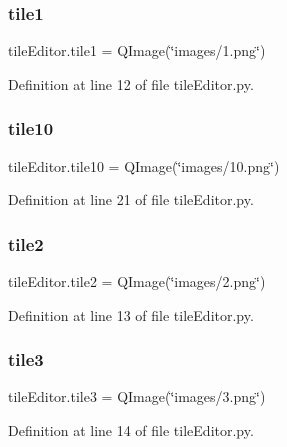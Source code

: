 \subsubsection{\texorpdfstring{tile1}{tile1}}
{\footnotesize\ttfamily tile\+Editor.\+tile1 = Q\+Image(\char`\"{}images/1.png\char`\"{})}



Definition at line 12 of file tile\+Editor.\+py.

\mbox{\label{namespacetile_editor_a4f521722eb6ae5c8ce168c96f599e29c}} 
\subsubsection{\texorpdfstring{tile10}{tile10}}
{\footnotesize\ttfamily tile\+Editor.\+tile10 = Q\+Image(\char`\"{}images/10.png\char`\"{})}



Definition at line 21 of file tile\+Editor.\+py.

\mbox{\label{namespacetile_editor_a66d3a5472cadf985b7cb0b4da030a7fb}} 
\subsubsection{\texorpdfstring{tile2}{tile2}}
{\footnotesize\ttfamily tile\+Editor.\+tile2 = Q\+Image(\char`\"{}images/2.png\char`\"{})}



Definition at line 13 of file tile\+Editor.\+py.

\mbox{\label{namespacetile_editor_a72df6660d2587b147b6a88fbe073857f}} 
\subsubsection{\texorpdfstring{tile3}{tile3}}
{\footnotesize\ttfamily tile\+Editor.\+tile3 = Q\+Image(\char`\"{}images/3.png\char`\"{})}



Definition at line 14 of file tile\+Editor.\+py.

\mbox{\label{namespacetile_editor_a987733b8130a9627c65803fd878268af}} 
